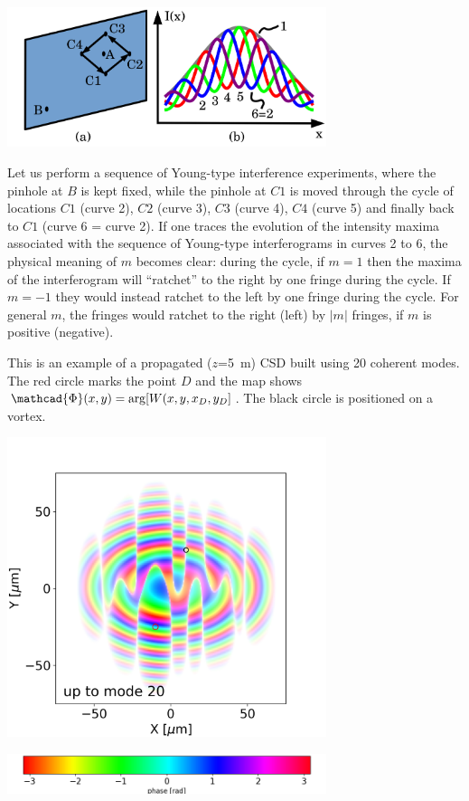 \documentclass[a4paper,10pt]{article}
\begin{document}
\includegraphics[width=0.7\textwidth]{Figures/Anholonomy.png}

 
Let us perform a sequence of Young-type interference experiments, where the pinhole at $B$ is kept fixed, while the pinhole at $C1$ is moved through the cycle of locations $C1$ (curve 2), $C2$ (curve 3), $C3$ (curve 4), $C4$ (curve 5) and finally back to $C1$ (curve 6 = curve 2). If one traces the evolution of the intensity maxima associated with the sequence of Young-type interferograms in curves 2 to 6, the physical meaning of $m$ becomes clear: during the cycle, if $m=1$ then the maxima of the interferogram will ``ratchet'' to the right by one fringe during the cycle. If $m=-1$ they would instead ratchet to the left by one fringe during the cycle.  For general $m$, the fringes would ratchet to the right (left) by $|m|$ fringes, if $m$ is positive (negative).

This is an example of a propagated ($z$=5~m) CSD built using 20 coherent modes. The red circle marks the point $D$ and the map shows $\mathcad{\Phi}(x,y)=\arg[W(x,y,x_D,y_D]$. The black circle is positioned on a vortex. 
 

\includegraphics[width=0.7\textwidth]{FiguresPoster/interference_D_uptomode0020_csd.png}


\includegraphics[width=0.7\textwidth]{Figures/colorbar.png}
\end{document}
